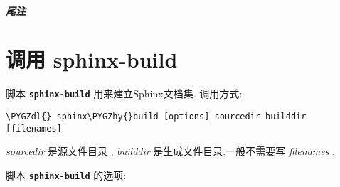 \documentclass[letterpaper,10pt,english]{sphinxmanual}
\def\PYGZdl{\char`\$}
\def\PYGZhy{\char`\-}
\begin{document}
\paragraph{尾注}


\chapter{调用 sphinx-build}
\label{invocation:sphinx-build}\label{invocation:invocation}\label{invocation::doc}
脚本 \textbf{\texttt{sphinx-build}} 用来建立Sphinx文档集.
调用方式:

\begin{Verbatim}[commandchars=\\\{\}]
\PYGZdl{} sphinx\PYGZhy{}build [options] sourcedir builddir [filenames]
\end{Verbatim}

\emph{sourcedir} 是源文件目录  {\hyperref[glossary:term\string-source\string-directory]{}} , \emph{builddir} 是生成文件目录.一般不需要写 \emph{filenames} .

脚本 \textbf{\texttt{sphinx-build}} 的选项:
\end{document}
